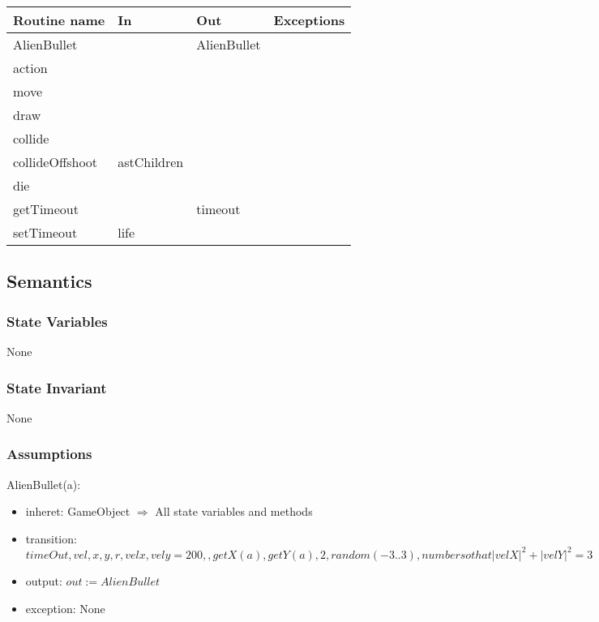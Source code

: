 \documentclass[12pt]{article}
\begin{document}
\newpage

\begin{tabular}{| l | l | l | l |}
    \hline
    \textbf{Routine name} & \textbf{In} & \textbf{Out} & \textbf{Exceptions}\\
    \hline
    AlienBullet & ~ & AlienBullet & ~\\
    \hline
    action & ~ & ~ & ~\\
    \hline
    move & ~ & ~ & ~\\
    \hline
    draw & ~ & ~ & ~\\
    \hline
    collide & ~ & ~ & ~\\
    \hline
    collideOffshoot & astChildren & ~ & ~\\
    \hline
    die & ~ & ~ & ~\\
    \hline
    getTimeout & ~ & timeout & ~\\
    \hline
    setTimeout & life & ~ & ~\\
    \hline
\end{tabular}

\subsection* {Semantics}

\subsubsection* {State Variables}

None

\subsubsection* {State Invariant}

None

\subsubsection* {Assumptions}

AlienBullet(a):
\begin{itemize}
    \item inheret: GameObject $\Rightarrow$ All state variables and methods
    \item transition: $ timeOut, vel, x, y, r, velx, vely = 200, {}, getX(a), getY(a), 2, random(-3..3), number so that |velX|^2 + |velY|^2 = 3$
    \item output: $out := AlienBullet$
    \item exception: None
\end{itemize}
\end{document}
